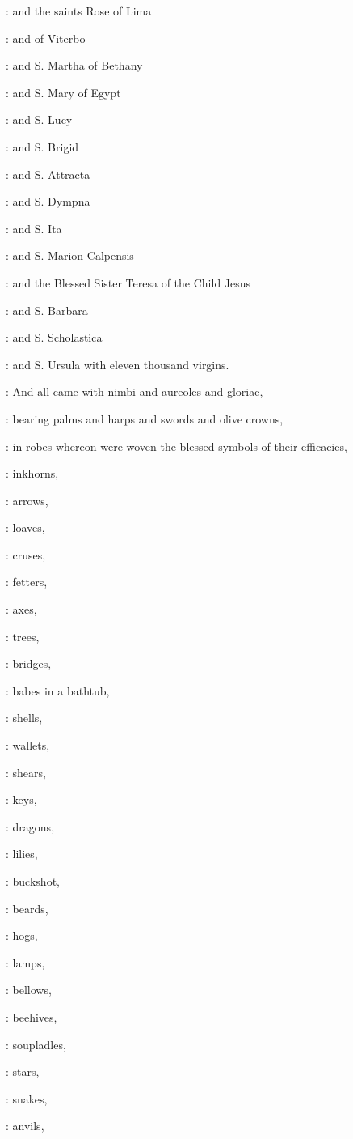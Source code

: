 :
and the saints Rose of Lima 

:
and of Viterbo 

:
and S. Martha of Bethany 

:
and S. Mary of Egypt 

:
and S. Lucy 

:
and S. Brigid 

:
and S. Attracta 

:
and S. Dympna 

:
and S. Ita 

:
and S. Marion Calpensis 

:
and the Blessed Sister Teresa of the Child Jesus 

:
and S. Barbara 

:
and S. Scholastica 

:
and S. Ursula with eleven thousand virgins.

:
And all came with nimbi and aureoles and gloriae,

:
bearing palms and harps and swords and olive crowns,

:
in robes whereon were woven the blessed symbols of their efficacies,

:
inkhorns,

:
arrows,

:
loaves,

:
cruses,

:
fetters,

:
axes,

:
trees,

:
bridges,

:
babes in a bathtub,

:
shells,

:
wallets,

:
shears,

:
keys,

:
dragons,

:
lilies,

:
buckshot,

:
beards,

:
hogs,

:
lamps,

:
bellows,

:
beehives,

:
soupladles,

:
stars,

:
snakes,

:
anvils,


